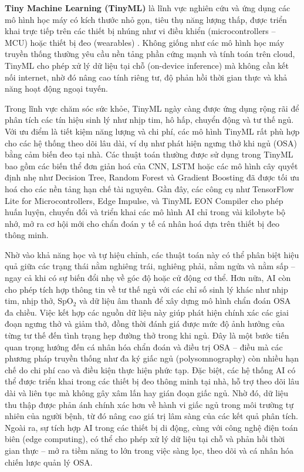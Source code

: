 \textbf{Tiny Machine Learning (TinyML)} là lĩnh vực nghiên cứu và ứng dụng các 
mô hình học máy có kích thước nhỏ gọn, tiêu thụ năng lượng thấp, 
được triển khai trực tiếp trên các thiết bị nhúng như vi điều khiển 
(microcontrollers – MCU) hoặc thiết bị đeo (wearables) \cite{ray2021tinyml}. 
Không giống như các mô hình học máy truyền thống thường yêu cầu nền 
tảng phần cứng mạnh và tính toán trên cloud, TinyML cho phép xử lý dữ 
liệu tại chỗ (on-device inference) mà không cần kết nối internet, 
nhờ đó nâng cao tính riêng tư, độ phản hồi thời gian thực và khả năng 
hoạt động ngoại tuyến.

Trong lĩnh vực chăm sóc sức khỏe, TinyML ngày càng được ứng dụng rộng 
rãi để phân tích các tín hiệu sinh lý như nhịp tim, hô hấp, chuyển động 
và tư thế ngủ. Với ưu điểm là tiết kiệm năng lượng và chi phí, 
các mô hình TinyML rất phù hợp cho các hệ thống theo dõi lâu dài, 
ví dụ như phát hiện ngưng thở khi ngủ (OSA) bằng cảm biến đeo tại nhà. 
Các thuật toán thường được sử dụng trong TinyML bao gồm các biến thể đơn giản hoá của CNN, 
LSTM hoặc các mô hình cây quyết định nhẹ như Decision Tree, Random Forest và Gradient Boosting 
đã được tối ưu hoá cho các nền tảng hạn chế tài nguyên.
Gần đây, các công cụ như TensorFlow Lite for Microcontrollers, 
Edge Impulse, và TinyML EON Compiler cho phép huấn luyện, 
chuyển đổi và triển khai các mô hình AI chỉ trong vài kilobyte bộ nhớ, 
mở ra cơ hội mới cho chẩn đoán y tế cá nhân hoá dựa trên thiết bị đeo thông minh.

Nhờ vào khả năng học và tự hiệu chỉnh, các thuật toán này có thể phân 
biệt hiệu quả giữa các trạng thái nằm nghiêng trái, nghiêng phải, nằm ngửa và nằm sấp – 
ngay cả khi có sự biến đổi nhẹ về góc độ hoặc cử động cơ thể. 
Hơn nữa, AI còn cho phép tích hợp thông tin về tư thế ngủ với các chỉ số sinh lý 
khác như nhịp tim, nhịp thở, SpO$_2$ và dữ liệu âm thanh để xây 
dựng mô hình chẩn đoán OSA đa chiều. Việc kết hợp các nguồn dữ liệu 
này giúp phát hiện chính xác các giai đoạn ngưng thở và giảm thở, 
đồng thời đánh giá được mức độ ảnh hưởng của từng tư thế đến tình trạng 
hẹp đường thở trong khi ngủ. Đây là một bước tiến quan trọng hướng đến 
cá nhân hóa chẩn đoán và điều trị OSA – điều mà các phương pháp truyền thống 
như đa ký giấc ngủ (polysomnography) còn nhiều hạn chế do chi phí cao và 
điều kiện thực hiện phức tạp. Đặc biệt, các hệ thống AI có thể được 
triển khai trong các thiết bị đeo thông minh tại nhà, hỗ trợ theo dõi 
lâu dài và liên tục mà không gây xâm lấn hay gián đoạn giấc ngủ. 
Nhờ đó, dữ liệu thu thập được phản ánh chính xác hơn về hành vi giấc 
ngủ trong môi trường tự nhiên của người bệnh, từ đó nâng cao giá trị 
lâm sàng của các kết quả phân tích. Ngoài ra, sự tích hợp AI trong các 
thiết bị di động, cùng với công nghệ điện toán biên (edge computing), 
có thể cho phép xử lý dữ liệu tại chỗ và phản hồi thời gian thực – 
mở ra tiềm năng to lớn trong việc sàng lọc, theo dõi và cá nhân hóa 
chiến lược quản lý OSA.

















